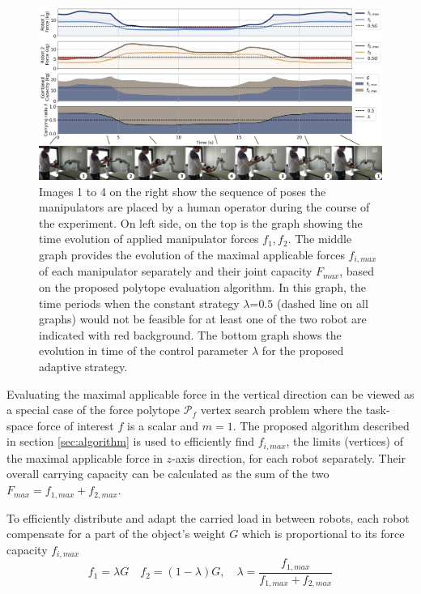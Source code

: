 \begin{figure}
    \centering
    \includegraphics[width=\linewidth]{Papers/images/exp_no_anim.jpg}
    \caption{Images 1 to 4 on the right show the sequence of poses the manipulators are placed by a human operator during the course of the experiment. On left side, on the top is the graph showing the time evolution of applied manipulator forces $f_1,f_2$. The middle graph provides the evolution of the maximal applicable forces $f_{i,max}$ of each manipulator separately and their joint capacity $F_{max}$, based on the proposed polytope evaluation algorithm. In this graph,  the time periods when the constant strategy $\lambda$=$0.5$ (dashed line on all graphs) would not be feasible for at least one of the two robot are indicated with red background. The bottom graph shows the  evolution in time of the control parameter $\lambda$ for the proposed adaptive strategy.}
    \label{fig:dual_manip}
\end{figure}


Evaluating the maximal applicable force in the vertical direction can be viewed as a special case of the force polytope $\mathcal{P}_f$ vertex search problem where the task-space force of interest $f$ is a scalar and $m=1$.
The proposed algorithm described in section \ref{sec:algorithm} is used to efficiently find $f_{i,max}$, the limits (vertices) of the maximal applicable force in $z$-axis direction, for each robot separately.  Their overall carrying capacity can be calculated as the sum of the two $F_{max} = f_{1,max} + f_{2,max}$.

To efficiently distribute and adapt the carried load in between robots, each robot compensate for a part of the object's weight $G$ which is proportional to its force capacity  $f_{i,max}$  
\begin{equation}
   f_1 = \lambda G \quad f_2 = (1-\lambda)G,\quad \lambda = \frac{f_{1,max}}{f_{1,max} + f_{2,max}}
\end{equation}

